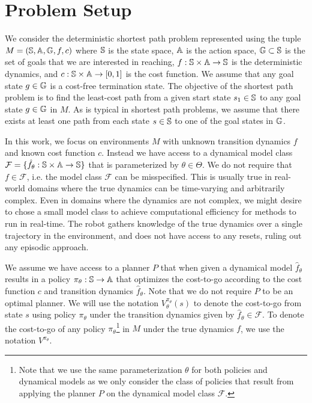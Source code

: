\section{Problem Setup}
\label{sec:problem-setup-1}

We consider the deterministic shortest path problem represented using
the tuple $M = (\mathbb{S}, \mathbb{A}, \mathbb{G}, f, c)$ where
$\mathbb{S}$ is the state space, $\mathbb{A}$ is the action space,
$\mathbb{G} \subset \mathbb{S}$ is the set of goals that we are
interested in reaching, $f: \mathbb{S} \times \mathbb{A}
\rightarrow \mathbb{S}$ is the deterministic dynamics, and $c:
\mathbb{S} \times \mathbb{A} \rightarrow [0, 1]$ is the cost
function. We assume that any goal state $g \in \mathbb{G}$ is a
cost-free termination state. The objective of the shortest path
problem is to find the least-cost path from a given start state $s_1
\in \mathbb{S}$ to any goal state $g \in \mathbb{G}$ in $M$. As is
typical in shortest path problems, we assume that there exists at
least one path from each state $s \in \mathbb{S}$ to one of the goal
states in $\mathbb{G}$.

In this work, we focus on environments $M$ with unknown transition
dynamics $f$ and known cost function $c$. Instead we have access to a
dynamical model class 
$\mathcal{F} = \{\hat{f}_\theta: \mathbb{S} \times \mathbb{A} \rightarrow
\mathbb{S} \}$ that is parameterized by $\theta \in \Theta$. We do
not require that $f \in \mathcal{F}$, i.e. the model class
$\mathcal{F}$ can be misspecified. This is usually true in real-world
domains where the true dynamics can be time-varying and arbitrarily
complex. Even in domains where the dynamics are not complex, we might
desire to chose a small model class to achieve computational
efficiency for methods to run in real-time. The robot gathers
knowledge of the true dynamics over a single trajectory in the
environment, and does not have access to any resets, ruling out any
episodic approach.

We assume we have access to a planner $P$ that when given a dynamical
model $\hat{f}_\theta$ results in a policy $\pi_\theta: \mathbb{S} \rightarrow
\mathbb{A}$ that optimizes 
the cost-to-go according to the cost function $c$ and transition
dynamics $\hat{f}_\theta$. Note that we do not require $P$ to be an
optimal planner. We will use the notation $V_\theta^{\pi_\theta}(s)$ to denote
the cost-to-go from state $s$ using policy $\pi_\theta$ under the transition
dynamics given by $\hat{f}_\theta \in \mathcal{F}$. To denote the
cost-to-go of any policy $\pi_\theta$\footnote{Note that we use the
  same parameterization $\theta$ for both policies and dynamical
  models as we only consider the class of policies that result from
  applying the planner $P$ on the dynamical model class
  $\mathcal{F}$.} in $M$ under the true dynamics $f$, we use the
notation $V^{\pi_\theta}$. 

